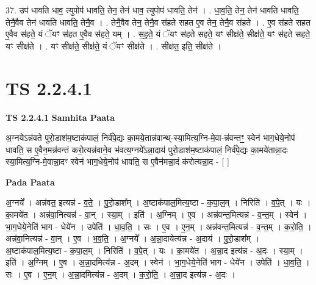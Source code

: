 \documentclass[17pt]{extarticle}
\begin{document}
37. उप॑ धावति धाव॒ त्युपोप॑ धावति॒ तेन॒ तेन॑ धाव॒ त्युपोप॑ धावति॒ तेन॑ । . धा॒व॒ति॒ तेन॒ तेन॑ धावति धावति॒ तेनै॒वैव तेन॑ धावति धावति॒ तेनै॒व । . तेनै॒वैव तेन॒ तेनै॒व स॑हते सहत ए॒व तेन॒ तेनै॒व स॑हते । . ए॒व स॑हते सहत ए॒वैव स॑हते॒ यं ॅयꣳ स॑हत ए॒वैव स॑हते॒ यम् । . स॒ह॒ते॒ यं ॅयꣳ स॑हते सहते॒ यꣳ सीक्ष॑ते॒ सीक्ष॑ते॒ यꣳ स॑हते सहते॒ यꣳ सीक्ष॑ते । . यꣳ सीक्ष॑ते॒ सीक्ष॑ते॒ यं ॅयꣳ सीक्ष॑ते । . सीक्ष॑त॒ इति॒ सीक्ष॑ते । \newline
\pagebreak
{}
\section*{ TS 2.2.4.1 }

\textbf{TS 2.2.4.1 } \newline
\textbf{Samhita Paata} \newline

अ॒ग्नयेऽन्न॑वते पुरो॒डाश॑म॒ष्टाक॑पालं॒ निर्व॑पे॒द्यः का॒मये॒तान्न॑वान्थ्-स्या॒मित्य॒ग्नि-मे॒वा-न्न॑वन्तꣳ॒॒ स्वेन॑ भाग॒धेये॒नोप॑ धावति॒ स ए॒वैन॒मन्न॑वन्तं करो॒त्यन्न॑वाने॒व भ॑वत्य॒ग्नये᳚ऽन्ना॒दाय॑ पुरो॒डाश॑म॒ष्टाक॑पालं॒ निर्व॑पे॒द्यः का॒मये॑तान्ना॒दः स्या॒मित्य॒ग्नि-मे॒वान्ना॒दꣳ स्वेन॑ भाग॒धेये॒नोप॑ धावति॒ स ए॒वैन॑मन्ना॒दं क॑रोत्यन्ना॒द - [  ] \newline

\textbf{Pada Paata} \newline

अ॒ग्नये᳚ । अन्न॑वत॒ इत्यन्न॑ - व॒ते॒ । पु॒रो॒डाश᳚म् । अ॒ष्टाक॑पाल॒मित्य॒ष्टा - क॒पा॒ल॒म् । निरिति॑ । व॒पे॒त् । यः । का॒मये॑त । अन्न॑वा॒नित्यन्न॑ - वा॒न् । स्या॒म् । इति॑ । अ॒ग्निम् । ए॒व । अन्न॑वन्त॒मित्यन्न॑ - व॒न्त॒म् । स्वेन॑ । भा॒ग॒धेये॒नेति॑ भाग - धेये॑न । उपेति॑ । धा॒व॒ति॒ । सः । ए॒व । ए॒न॒म् । अन्न॑वन्त॒मित्यन्न॑ - व॒न्त॒म् । क॒रो॒ति॒ । अन्न॑वा॒नित्यन्न॑ - वा॒न् । ए॒व । भ॒व॒ति॒ । अ॒ग्नये᳚ । अ॒न्ना॒दायेत्य॑न्न - अ॒दाय॑ । पु॒रो॒डाश᳚म् । अ॒ष्टाक॑पाल॒मित्य॒ष्टा - क॒पा॒ल॒म् । निरिति॑ । व॒पे॒त् । यः । का॒मये॑त । अ॒न्ना॒द इत्य॑न्न - अ॒दः । स्या॒म् । इति॑ । अ॒ग्निम् । ए॒व । अ॒न्ना॒दमित्य॑न्न - अ॒दम् । स्वेन॑ । भा॒ग॒धेये॒नेति॑ भाग - धेये॑न । उपेति॑ । धा॒व॒ति॒ । सः । ए॒व । ए॒न॒म् । अ॒न्ना॒दमित्य॑न्न - अ॒दम् । क॒रो॒ति॒ । अ॒न्ना॒द इत्य॑न्न - अ॒दः ।  \newline
\end{document}
